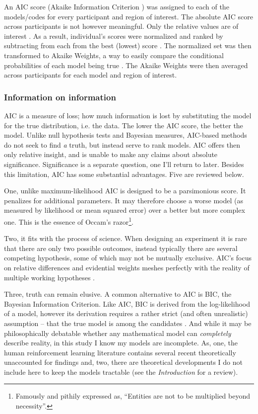 \documentclass[doc,12pt]{apa}        %
\begin{document}
An AIC score (Akaike Information Criterion \cite{Akaike:1974p9530}) was assigned to each of the models/codes for every participant and region of interest.  The absolute AIC score across participants is not however meaningful.  Only the relative values are of interest \cite{Wagenmakers:2004p9472}.  As a result, individual's scores were normalized and ranked by subtracting from each from the best (lowest) score \cite{Anderson:2000p9475}. The normalized set was then transformed to Akaike Weights, a way to easily compare the conditional probabilities of each model being true \cite{Wagenmakers:2004p9472}.  The Akaike Weights were then averaged across participants for each model and region of interest.

\subsubsection{Information on information}
\label{subsub:way}
AIC is a measure of loss; how much information is lost by substituting the model for the true distribution, i.e. the data.  The lower the AIC score, the better the model.  Unlike null hypothesis tests and Bayesian measures, AIC-based methods do not seek to find \emph{a} truth, but instead serve to rank models.  AIC offers then only relative insight, and is unable to make any claims about absolute significance.  Significance is a separate question, one I'll return to later.  Besides this limitation, AIC has some substantial advantages. Five are reviewed below.

One, unlike maximum-likelihood AIC is designed to be a parsimonious score.  It penalizes for additional parameters.  It may therefore choose a worse model (as measured by likelihood or mean squared error) over a better but more complex one. This is the essence of Occam's razor\footnote{Famously and pithily expressed as, ``Entities are not to be multiplied beyond necessity''.}. 

Two, it fits with the process of science.  When designing an experiment it is rare that there are only two possible outcomes, instead typically there are several competing hypothesis, some of which may not be mutually exclusive.  AIC's focus on relative differences and evidential weights meshes perfectly with the reality of multiple working hypotheses \cite{Burnham:2004p9621}.

Three, truth can remain elusive.  A common alternative to AIC is BIC, the Bayesian Information Criterion.  Like AIC, BIC is derived from the log-likelihood of a model, however its derivation requires a rather strict (and often unrealistic) assumption -- that the true model is among the candidates \cite{Forster:2000p9623}.  And while it may be philosophically debatable whether any mathematical model can \emph{completely} describe reality, in this study I know my models are incomplete.  As, one, the human reinforcement learning literature contains several recent theoretically unaccounted for findings and, two, there are theoretical developments I do not include here to keep the models tractable (see the \emph{Introduction} for a review).  
\end{document}
